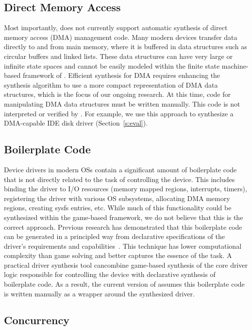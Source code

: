 \subsection{Direct Memory Access}

Most importantly, \termite does not currently support automatic synthesis of direct memory access (DMA) management code.  Many modern devices transfer data directly to and from main memory, where it is buffered in data structures such as circular buffers and linked lists.  These data structures can have very large or infinite state spaces and cannot be easily modeled within the finite state machine-based framework of \termite.  Efficient synthesis for DMA requires enhancing the synthesis algorithm to use a more compact representation of DMA data structures, which is the focus of our ongoing research.  At this time, code for manipulating DMA data structures must be written manually.  This code is not interpreted or verified by \termite.  For example, we use this approach to synthesize a DMA-capable IDE disk driver (Section~\ref{s:eval}).

\subsection{Boilerplate Code}

Device drivers in modern OSs contain a significant amount of boilerplate code that is not directly related to the task of controlling the device.  This includes binding the driver to I/O resources (memory mapped regions, interrupts, timers), registering the driver with various OS subsystems, allocating DMA memory regions, creating sysfs entries, etc.  While much of this functionality could be synthesized within the game-based framework, we do not believe that this is the correct approach.  Previous research has demonstrated that this boilerplate code can be generated in a principled way from declarative specifications of the driver's requirements and capabilities~\cite{Spear_RHHL_06}.  This technique has lower computational complexity than game solving and better captures the essence of the task.  A practical driver synthesis tool cancombine game-based synthesis of the core driver logic responsible for controlling the device with declarative synthesis of boilerplate code.  As a result, the current version of \termite assumes this boilerplate code is written manually as a wrapper around the synthesized driver.

\subsection{Concurrency}

